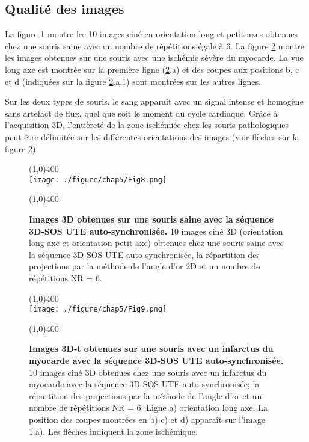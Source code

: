 \newpage
\subsection{Qualité des images}

La figure \ref{fig:ImSaine} montre les 10 images ciné en orientation long et petit axes obtenues chez une souris saine avec un nombre de répétitions égale à 6. La figure \ref{fig:ImInfarct} montre les images obtenues sur une souris avec une ischémie sévère du myocarde. La vue long axe est montrée sur la première ligne (\ref{fig:ImInfarct}.a) et des coupes aux positions b, c et d (indiquées sur la figure \ref{fig:ImInfarct}.a.1) sont montrées sur les autres lignes.

Sur les deux types de souris, le sang apparaît avec un signal intense et homogène sans artefact de flux, quel que soit le moment du cycle cardiaque. Grâce à l'acquisition 3D, l'entièreté de la zone ischémiée chez les souris pathologiques peut être délimitée sur les différentes orientations des images (voir flèches sur la figure \ref{fig:ImInfarct}).

\begin{figure}[H]
\centering
\line(1,0){400} \\
\texttt{[image: ./figure/chap5/Fig8.png]}
\caption[Images 3D obtenues sur une souris saine avec la séquence 3D-SOS UTE auto-synchronisée.]{\label{fig:ImSaine} \textbf{Images 3D obtenues sur une souris saine avec la séquence 3D-SOS UTE auto-synchronisée.} 10 images ciné 3D (orientation long axe et orientation petit axe) obtenues chez une souris saine avec la séquence 3D-SOS UTE auto-synchronisée, la répartition des projections par la méthode de l’angle d’or 2D et un nombre de répétitions NR = 6.}
\line(1,0){400} \\ 
\end{figure}

\begin{figure}[H]
\centering
\line(1,0){400} \\
\texttt{[image: ./figure/chap5/Fig9.png]}
\caption[Images 3D obtenues sur une souris avec un infarctus du myocarde avec la séquence 3D-SOS UTE auto-synchronisée.]{\label{fig:ImInfarct} \textbf{Images 3D-t obtenues sur une souris avec un infarctus du myocarde avec la séquence 3D-SOS UTE auto-synchronisée.} 10 images ciné 3D obtenues chez une souris avec un infarctus du myocarde avec la séquence 3D-SOS UTE auto-synchronisée; la répartition des projections par la méthode de l’angle d’or et un nombre de répétitions NR = 6. Ligne a) orientation long axe. La position des coupes montrées en b) c) et d) apparaît sur l’image 1.a). Les flèches indiquent la zone ischémique.}
\line(1,0){400} \\ 
\end{figure}


